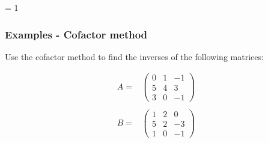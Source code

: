 \documentclass[usenames,dvipsnames,aspectratio=169,10pt]{beamer}
\def \EXAMPLEVERSION {3} %
\numberwithin{equation}{section}
\begin{document}
\ifnum \EXAMPLEVERSION = 1
\begin{frame}
\frametitle{Examples - Cofactor method}

Use the cofactor method to find the inverses of the following matrices:

\begin{align*}
A =& 
\begin{pmatrix}
  0 & 1 & -1 \\
  5 & 4 &  3 \\
  3 & 0 & -1
\end{pmatrix}
\\ \\
B =& 
\begin{pmatrix}
  1 & 2 &  0 \\
  5 & 2 & -3 \\
  1 & 0 & -1
\end{pmatrix}
\end{align*}

\end{frame}
\end{document}
